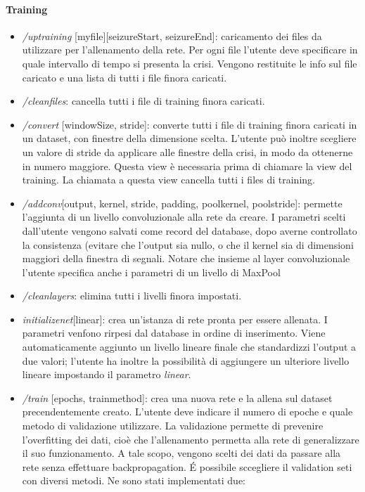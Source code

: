 \documentclass{article}
\begin{document}
\paragraph{Training}
\begin{itemize}
\item \textit{/uptraining} [myfile][seizureStart, seizureEnd]: caricamento dei files da utilizzare per l'allenamento della rete. Per ogni file l'utente deve specificare in quale intervallo di tempo si presenta la crisi. Vengono restituite le info sul file caricato e una lista di tutti i file finora caricati.
\item \textit{/cleanfiles}: cancella tutti i file di training finora caricati. 
\item \textit{/convert} [windowSize, stride]: converte tutti i file di training finora caricati in un dataset, con finestre della dimensione scelta. L'utente può inoltre scegliere un valore di stride da applicare alle finestre della crisi, in modo da ottenerne in numero maggiore. Questa view è necessaria prima di chiamare la view del training. La chiamata a questa view cancella tutti i files di training. 
\item \textit{/addconv}[output, kernel, stride, padding, pool\textunderscore kernel, pool\textunderscore stride]: permette l'aggiunta di un livello convoluzionale alla rete da creare. I parametri scelti dall'utente vengono salvati come record del database, dopo averne controllato la consistenza (evitare che l'output sia nullo, o che il kernel sia di dimensioni maggiori della finestra di segnali. Notare che insieme al layer convoluzionale l'utente specifica anche i parametri di un livello di MaxPool
\item \textit{/cleanlayers}: elimina tutti i livelli finora impostati.
\item \textit{initializenet}[linear]: crea un'istanza di rete pronta per essere allenata. I parametri venfono rirpesi dal database in ordine di inserimento. Viene automaticamente aggiunto un livello lineare finale che standardizzi l'output a due valori; l'utente ha inoltre la possibilità di aggiungere un ulteriore livello lineare impostando il parametro \textit{linear}.
\item \textit{/train} [epochs, train\textunderscore method]: crea una nuova rete e la allena sul dataset precendentemente creato. L'utente deve indicare il numero di epoche e quale metodo di validazione utilizzare. La validazione permette di prevenire l'overfitting dei dati, cioè che l'allenamento permetta alla rete di generalizzare il suo funzionamento. A tale scopo, vengono scelti dei dati da passare alla rete senza effettuare backpropagation. \'E possibile sccegliere il validation seti con diversi metodi. Ne sono stati implementati due:

\end{itemize}
\end{document}

